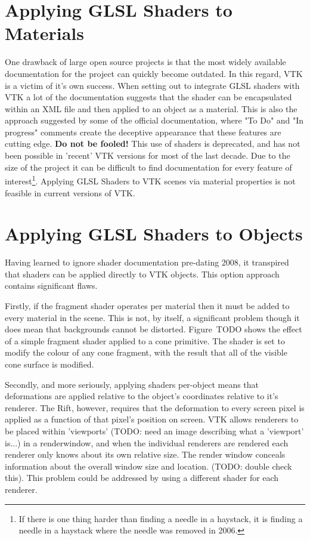 \documentclass[MSc,paper=a4,pagesize=auto]{icldt}
\begin{document}
\section{Applying GLSL Shaders to Materials}
One drawback of large open source projects is that the most widely available documentation for the project can quickly become outdated. In this regard, VTK is a victim of it's own success. When setting out to integrate GLSL shaders with VTK a lot of the documentation suggests that the shader can be encapsulated within an XML file and then applied to an object as a material. This is also the approach suggested by some of the official documentation, where "To Do" and "In progress" comments create the deceptive appearance that these features are cutting edge. \textbf{Do not be fooled!} This use of shaders is deprecated, and has not been possible in 'recent' VTK versions for most of the last decade. Due to the size of the project it can be difficult to find documentation for every feature of interest\footnote{If there is one thing harder than finding a needle in a haystack, it is finding a needle in a haystack where the needle was removed in 2006.}. 
Applying GLSL Shaders to VTK scenes via material properties is not feasible in current versions of VTK.


\section{Applying GLSL Shaders to Objects}
Having learned to ignore shader documentation pre-dating 2008, it transpired that shaders can be applied directly to VTK objects. This option approach contains  significant flaws. 

Firstly, if the fragment shader operates per material then it must be added to every material in the scene. This is not, by itself, a significant problem though it does mean that backgrounds cannot be distorted. Figure~TODO shows the effect of a simple fragment shader applied to a cone primitive. The shader is set to modify the colour of any cone fragment, with the result that all of the visible cone surface is modified.

Secondly, and more seriously, applying shaders per-object means that deformations are applied relative to the object's coordinates relative to it's renderer. The Rift, however, requires that the deformation to every screen pixel is applied as a function of that pixel's position on screen. VTK allows renderers to be placed within 'viewports' (TODO: need an image describing what a 'viewport' is...) in a renderwindow, and when the individual renderers are rendered each renderer only knows about its own relative size. The render window conceals information about the overall window size and location. (TODO: double check this). This problem could be addressed by using a different shader for each renderer.
\end{document}

